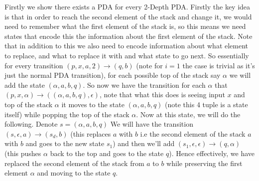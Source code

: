 \documentclass[11pt]{article}
\begin{document}
\begin{enumerate}
\begin{answer}
  Firstly we show there exists a PDA for every 2-Depth PDA. Firstly the key idea is that in order to reach the second element of the stack and change it, we would need to remember what the first element of the stack is, so this means we need states that encode this the information about the first element of the stack. Note that in addition to this we also need to encode information about what element to replace, and what to replace it with and what state to go next. So essentially for every transition $(p, x, a, 2) \to (q, b)$ (note for $i = 1$ the case is trivial as it's just the normal PDA transition), for each possible top of the stack say $\alpha$ we will add the state $(\alpha, a, b, q)$. So now we have the transition for each $\alpha$ that $(p, x, \alpha) \to ((\alpha, a, b, q), \epsilon)$, note that what this does is seeing input $x$ and top of the stack $\alpha$ it moves to the state $(\alpha, a, b, q)$ (note this 4 tuple is a state itself) while popping the top of the stack $\alpha$. Now at this state, we will do the following. Denote $s = (\alpha, a, b, q)$ We will have the transition $(s, \epsilon, a) \to (s_d, b)$ (this replaces $a$ with $b$ i.e the second element of the stack $a$ with $b$ and goes to the new state $s_{1}$) and then we'll add $(s_{1}, \epsilon, \epsilon) \to (q, \alpha)$ (this pushes $\alpha$ back to the top and goes to the state $q$). Hence effectively, we have replaced the second element of the stack from $a$ to $b$ while preserving the first element $\alpha$ and moving to the state $q$.


\end{answer}
\end{enumerate}
\end{document}
